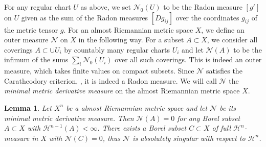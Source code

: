 \documentclass[12pt,leqno]{amsart}
\numberwithin{equation}{section}
\newtheorem{lem}[thm]{Lemma}
\theoremstyle{definition}
\theoremstyle{remark}
\begin{document}
For any regular chart $U$ as above, we set $\mathcal N_0 (U)$ to be the Radon measure $[g']$ on $U$ given as the sum of
the Radon measures $[D g_{ij}]$ over the coordinates $ g_{ij}$ of the metric tensor $g$.
For an almost Riemannian metric space $X$, we define an outer measure $\mathcal N$ on $X$  in the following way.
For a subset $A\subset X$, we consider all  coverings $A\subset \cup U_i$ by  countably many regular charts $U_i$ and let $\mathcal N(A)$
to be the infimum of the sums $\sum_i \mathcal N_0 (U_i)$  over all such coverings.  This is indeed an outer measure, which takes finite values on compact subsets.  Since $\mathcal N$  satisfies the Caratheodory criterion, \cite[Theorem 1.9]{Evans},  it is indeed a Radon measure.  We will call $\mathcal N$ the \emph{minimal metric derivative measure} on the almost Riemannian metric space $X$.


\begin{lem} \label{lem:minderiv}
Let $X^n$ be a almost Riemannian metric space and let $\mathcal N$ be its minimal  metric derivative measure.
Then $\mathcal N (A)=0$ for any Borel subset $A\subset X$ with $\mathcal H^{n-1} (A)<\infty$.
There exists a Borel subset $C\subset X$ of full $\mathcal H^n$-measure in $X$ with
$\mathcal N(C)=0$, thus $\mathcal N$ is absolutely singular with respect to $\mathcal H^n$.
\end{lem}
\end{document}
